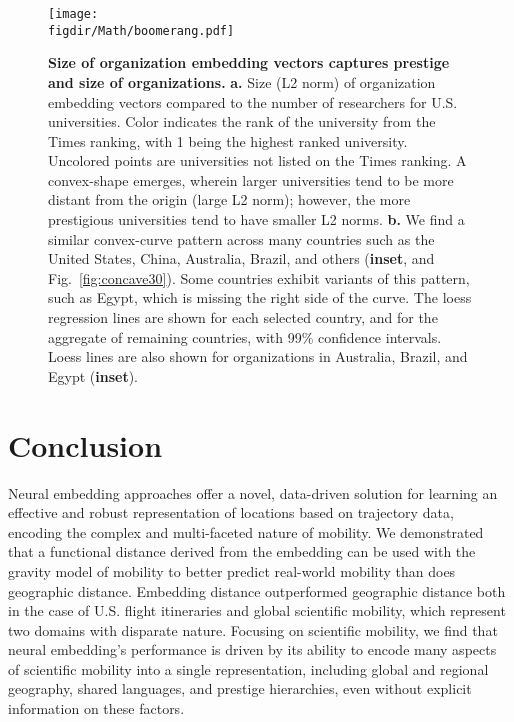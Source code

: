 \documentclass[12pt]{article} %
\def\figdir{../Figs}
\begin{document}
%
%
\begin{figure}[h!]
	\centering
	\texttt{[image: \\figdir/Math/boomerang.pdf]}
	\caption{
		\textbf{Size of organization embedding vectors captures prestige and size of organizations.}
		\textbf{a.} Size (L2 norm) of organization embedding vectors compared to the number of researchers for U.S. universities.
		Color indicates the rank of the university from the Times ranking, with 1 being the highest ranked university.
		Uncolored points are universities not listed on the Times ranking.
		A convex-shape emerges, wherein larger universities tend to be more distant from the origin (large L2 norm); however, the more prestigious universities tend to have smaller L2 norms.
		\textbf{b.} We find a similar convex-curve pattern across many countries such as the United States, China, Australia, Brazil, and others (\textbf{inset}, and Fig.~\ref{fig:concave30}). 
		Some countries exhibit variants of this pattern, such as Egypt, which is missing the right side of the curve.
		The loess regression lines are shown for each selected country, and for the aggregate of remaining countries, with 99\% confidence intervals.
		Loess lines are also shown for organizations in Australia, Brazil, and Egypt (\textbf{inset}).
	}
	\label{fig:length}
\end{figure}


%
%
\section*{Conclusion}

Neural embedding approaches offer a novel, data-driven solution for learning an effective and robust representation of locations based on trajectory data, encoding the complex and multi-faceted nature of mobility.
We demonstrated that a functional distance derived from the embedding can be used with the gravity model of mobility to better predict real-world mobility than does geographic distance.
Embedding distance outperformed geographic distance both in the case of U.S. flight itineraries and global scientific mobility, which represent two domains with disparate nature. 
Focusing on scientific mobility, we find that neural embedding's performance is driven by its ability to encode many aspects of scientific mobility into a single representation, including global and regional geography, shared languages, and prestige hierarchies, even without explicit information on these factors.
\end{document}
